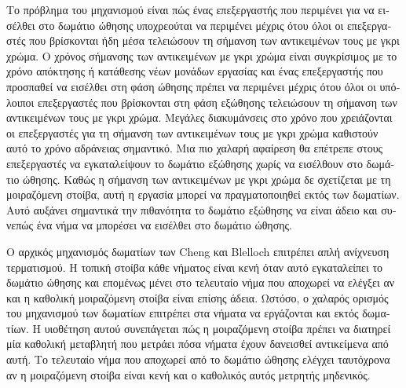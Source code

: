 \begin{greek}
Το πρόβλημα του μηχανισμού είναι πώς ένας επεξεργαστής που
περιμένει για να εισέλθει στο δωμάτιο ώθησης υποχρεούται
να περιμένει μέχρις ότου όλοι οι επεξεργαστές που βρίσκονται
ήδη μέσα τελειώσουν τη σήμανση των αντικειμένων τους με
γκρι χρώμα. Ο χρόνος σήμανσης των αντικειμένων με γκρι
χρώμα είναι συγκρίσιμος με το χρόνο απόκτησης ή κατάθεσης
νέων μονάδων εργασίας και ένας επεξεργαστής που προσπαθεί
να εισέλθει στη φάση ώθησης πρέπει να περιμένει μέχρις ότου
όλοι οι υπόλοιποι επεξεργαστές που βρίσκονται στη φάση
εξώθησης τελειώσουν τη σήμανση των αντικειμένων τους με
γκρι χρώμα. Μεγάλες διακυμάνσεις στο χρόνο που χρειάζονται
οι επεξεργαστές για τη σήμανση των αντικειμένων τους με γκρι
χρώμα καθιστούν αυτό το χρόνο αδράνειας σημαντικό. Μια πιο
χαλαρή αφαίρεση θα επέτρεπε στους επεξεργαστές να εγκαταλείψουν
το δωμάτιο εξώθησης χωρίς να εισέλθουν στο δωμάτιο ώθησης.
Καθώς η σήμανση των αντικειμένων με γκρι χρώμα δε σχετίζεται
με τη μοιραζόμενη στοίβα, αυτή η εργασία μπορεί να πραγματοποιηθεί
εκτός των δωματίων. Αυτό αυξάνει σημαντικά την πιθανότητα
το δωμάτιο εξώθησης να είναι άδειο και συνεπώς ένα νήμα να
μπορέσει να εισέλθει στο δωμάτιο ώθησης.

Ο αρχικός μηχανισμός δωματίων των Cheng και Blelloch επιτρέπει
απλή ανίχνευση τερματισμού. Η τοπική στοίβα κάθε νήματος
είναι κενή όταν αυτό εγκαταλείπει το δωμάτιο ώθησης και επομένως
μένει στο τελευταίο νήμα που αποχωρεί να ελέγξει αν και
η καθολική μοιραζόμενη στοίβα είναι επίσης άδεια. Ωστόσο,
ο χαλαρός ορισμός του μηχανισμού των δωματίων επιτρέπει
στα νήματα να εργάζονται και εκτός δωματίων. Η υιοθέτηση αυτού
συνεπάγεται πώς η μοιραζόμενη στοίβα πρέπει να διατηρεί μία
καθολική μεταβλητή που μετράει πόσα νήματα έχουν δανεισθεί
αντικείμενα από αυτή. Το τελευταίο νήμα που αποχωρεί από το
δωμάτιο ώθησης ελέγχει ταυτόχρονα αν η μοιραζόμενη στοίβα είναι
κενή και ο καθολικός αυτός μετρητής μηδενικός.


\end{greek}
